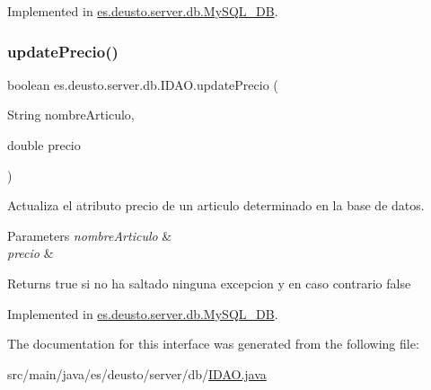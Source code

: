 Implemented in \mbox{\hyperlink{classes_1_1deusto_1_1server_1_1db_1_1_my_s_q_l___d_b_a202f75db3e7f693f85af3fa38d7f1939}{es.\+deusto.\+server.\+db.\+My\+S\+Q\+L\+\_\+\+DB}}.

\mbox{\label{interfacees_1_1deusto_1_1server_1_1db_1_1_i_d_a_o_ae00eb9c5a9caa20fc72cad7b8054ce17}} 
\subsubsection{\texorpdfstring{updatePrecio()}{updatePrecio()}}
{\footnotesize\ttfamily boolean es.\+deusto.\+server.\+db.\+I\+D\+A\+O.\+update\+Precio (\begin{DoxyParamCaption}\item[{String}]{nombre\+Articulo,  }\item[{double}]{precio }\end{DoxyParamCaption})}

Actualiza el atributo precio de un articulo determinado en la base de datos. 
\begin{DoxyParams}{Parameters}
{\em nombre\+Articulo} & \\
\hline
{\em precio} & \\
\hline
\end{DoxyParams}
\begin{DoxyReturn}{Returns}
true si no ha saltado ninguna excepcion y en caso contrario false 
\end{DoxyReturn}


Implemented in \mbox{\hyperlink{classes_1_1deusto_1_1server_1_1db_1_1_my_s_q_l___d_b_ab906a09145b0248413b7f17342f15bd2}{es.\+deusto.\+server.\+db.\+My\+S\+Q\+L\+\_\+\+DB}}.



The documentation for this interface was generated from the following file\+:\begin{DoxyCompactItemize}
\item 
src/main/java/es/deusto/server/db/\mbox{\hyperlink{_i_d_a_o_8java}{I\+D\+A\+O.\+java}}\end{DoxyCompactItemize}

